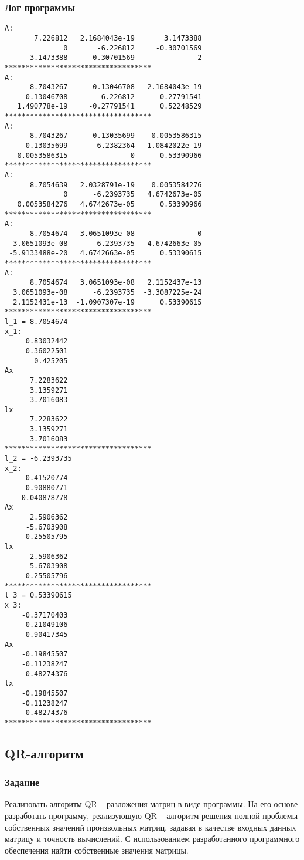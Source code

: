 \documentclass[a4paper,12pt]{article}
\begin{document}
\subsubsection{Лог программы}
\begin{verbatim}
A:
       7.226812   2.1684043e-19       3.1473388 
              0       -6.226812     -0.30701569 
      3.1473388     -0.30701569               2 
***********************************
A:
      8.7043267     -0.13046708   2.1684043e-19 
    -0.13046708       -6.226812     -0.27791541 
   1.490778e-19     -0.27791541      0.52248529 
***********************************
A:
      8.7043267     -0.13035699    0.0053586315 
    -0.13035699      -6.2382364   1.0842022e-19 
   0.0053586315               0      0.53390966 
***********************************
A:
      8.7054639   2.0328791e-19    0.0053584276 
              0      -6.2393735   4.6742673e-05 
   0.0053584276   4.6742673e-05      0.53390966 
***********************************
A:
      8.7054674   3.0651093e-08               0 
  3.0651093e-08      -6.2393735   4.6742663e-05 
 -5.9133488e-20   4.6742663e-05      0.53390615 
***********************************
A:
      8.7054674   3.0651093e-08   2.1152437e-13 
  3.0651093e-08      -6.2393735  -3.3087225e-24 
  2.1152431e-13  -1.0907307e-19      0.53390615 
***********************************
l_1 = 8.7054674
x_1:
     0.83032442 
     0.36022501 
       0.425205 
Ax
      7.2283622 
      3.1359271 
      3.7016083 
lx
      7.2283622 
      3.1359271 
      3.7016083 
***********************************
l_2 = -6.2393735
x_2:
    -0.41520774 
     0.90880771 
    0.040878778 
Ax
      2.5906362 
     -5.6703908 
    -0.25505795 
lx
      2.5906362 
     -5.6703908 
    -0.25505796 
***********************************
l_3 = 0.53390615
x_3:
    -0.37170403 
    -0.21049106 
     0.90417345 
Ax
    -0.19845507 
    -0.11238247 
     0.48274376 
lx
    -0.19845507 
    -0.11238247 
     0.48274376 
***********************************
\end{verbatim}

\newpage

\subsection{QR-алгоритм}
\subsubsection{Задание}
Реализовать алгоритм QR – разложения матриц в виде программы.
На его основе разработать программу, реализующую QR – алгоритм решения
полной проблемы собственных значений произвольных матриц, задавая в
качестве входных данных матрицу и точность вычислений. С использованием
разработанного программного обеспечения найти собственные значения матрицы.
\end{document}
